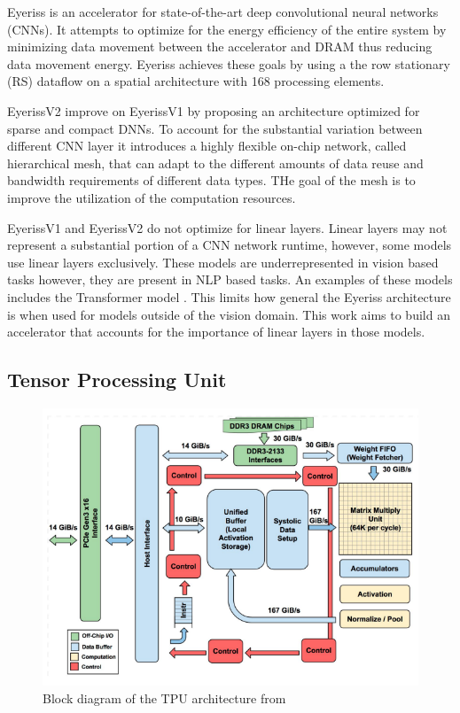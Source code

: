 Eyeriss \cite{isscc_2016_chen_eyeriss} is an accelerator for state-of-the-art
deep convolutional neural networks (CNNs). It attempts to optimize for the
energy efficiency of the entire system by minimizing data movement between the
accelerator and DRAM thus reducing data movement energy. Eyeriss achieves these
goals by using a the row stationary (RS) dataflow on a spatial architecture with
168 processing elements. 

EyerissV2 \cite{eyerissv2} improve on EyerissV1 by proposing an architecture
optimized for sparse and compact DNNs. To account for the substantial variation
between different CNN layer it introduces a highly flexible on-chip network,
called hierarchical mesh, that can adapt to the different amounts of data reuse
and bandwidth requirements of different data types. THe goal of the mesh is to
improve the utilization of the computation resources.

EyerissV1 and EyerissV2 do not optimize for linear layers. Linear layers may not
represent a substantial portion of a CNN network runtime, however, some models
use linear layers exclusively. These models are underrepresented in vision based
tasks however, they are present in NLP based tasks. An examples of these models
includes the Transformer model \cite{transformer_model}. This limits how general
the Eyeriss architecture is when used for models outside of the vision domain.
This work aims to build an accelerator that accounts for the importance of
linear layers in those models. 

\subsection{Tensor Processing Unit}
\label{chap:related_work:tpu}

\begin{figure}[!ht]
    \centering
    \includegraphics[scale=0.45]{fig/tpu.png}
    \caption{Block diagram of the TPU architecture from \cite{tpu}}
    \label{fig:tpu_arch}
\end{figure}

